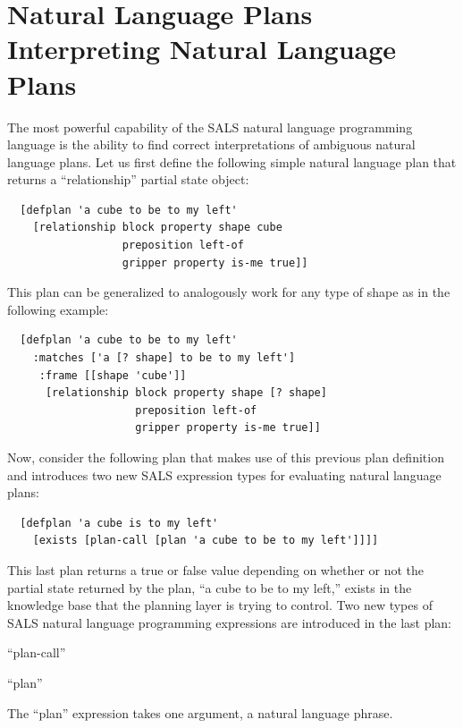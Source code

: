 \section{Natural Language Plans Interpreting Natural Language Plans}

The most powerful capability of the SALS natural language programming
language is the ability to find correct interpretations of ambiguous
natural language plans.  Let us first define the following simple
natural language plan that returns a ``relationship'' partial state
object:
\begin{samepage}
\begin{Verbatim}
  [defplan 'a cube to be to my left'
    [relationship block property shape cube
                  preposition left-of
                  gripper property is-me true]]
\end{Verbatim}
\end{samepage}
This plan can be generalized to analogously work for any type of shape
as in the following example:
\begin{samepage}
\begin{Verbatim}
  [defplan 'a cube to be to my left'
    :matches ['a [? shape] to be to my left']
     :frame [[shape 'cube']]
      [relationship block property shape [? shape]
                    preposition left-of
                    gripper property is-me true]]
\end{Verbatim}
\end{samepage}
Now, consider the following plan that makes use of this previous plan
definition and introduces two new SALS expression types for evaluating
natural language plans:
\begin{samepage}
\begin{Verbatim}
  [defplan 'a cube is to my left'
    [exists [plan-call [plan 'a cube to be to my left']]]]
\end{Verbatim}
\end{samepage}
This last plan returns a true or false value depending on whether or
not the partial state returned by the plan, ``a cube to be to my
left,'' exists in the knowledge base that the planning layer is trying
to control.  Two new types of SALS natural language programming
expressions are introduced in the last plan:
\begin{packed_enumerate}
\item{``plan-call''}
\item{``plan''}
\end{packed_enumerate}
The ``plan'' expression takes one argument, a natural language phrase.
